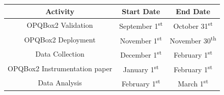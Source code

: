 \begin{center}
\begin{tabular}{ ||c | c c|| }
\hline
 \textbf{Activity} & \textbf{Start Date} & \textbf{End Date} \\ 
 \hline
 \hline
 OPQBox2 Validation & September 1\textsuperscript{st} & October 31\textsuperscript{st} \\  
 OPQBox2 Deployment & November 1\textsuperscript{st} & November 30\textsuperscript{th}   \\
 Data Collection & December 1\textsuperscript{st} & February 1\textsuperscript{st}   \\
 OPQBox2 Instrumentation paper & January 1\textsuperscript{st} & February 1\textsuperscript{st}   \\
 Data Analysis & February 1\textsuperscript{st} & March 1\textsuperscript{st}  \\
 \hline
 
\end{tabular}
\end{center}
